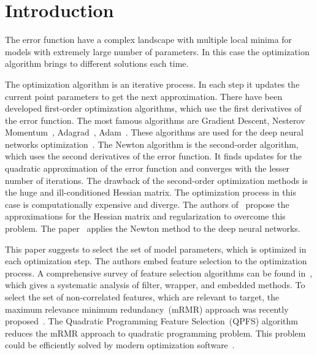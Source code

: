 \documentclass[
11pt,%
tightenlines,%
twoside,%
onecolumn,%
nofloats,%
nobibnotes,%
nofootinbib,%
superscriptaddress,%
noshowpacs,%
centertags]%
{revtex4}
\begin{document}


\maketitle


\section{Introduction}
The error function have a complex landscape with multiple local minima for models with extremely large number of parameters. 
In this case the optimization algorithm brings to different solutions each time.

The optimization algorithm is an iterative process. 
In each step it updates the current point parameters to get the next approximation.
There have been developed first-order optimization algorithms, which use the first derivatives of the error function. 
The most famous algorithms are Gradient Descent, Nesterov Momentum~\cite{nesterov1983momentum}, Adagrad~\cite{duchi2011adagrad}, Adam~\cite{kingma2014adam}. 
These algorithms are used for the deep neural networks optimization~\cite{goodfellow2016deeplearningbook}. 
The Newton algorithm is the second-order algorithm, which uses the second derivatives of the error function. 
It finds updates for the quadratic approximation of the error function and converges with the lesser number of iterations.
The drawback of the second-order optimization methods is the huge and ill-conditioned Hessian matrix. 
The optimization process in this case is computationally expensive and diverge. 
The authors of~\cite{avriel2003nonlinear,blaschke1997convergence} propose the approximations for the Hessian matrix and regularization to overcome this problem.
The paper~\cite{botev2017newtondeeplearning} applies the Newton method to the deep neural networks.

This paper suggests to select the set of model parameters, which is optimized in each optimization step.
The authors embed feature selection to the optimization process.
A comprehensive survey of feature selection algorithms can be found in~\cite{li2017feature}, which gives a systematic analysis of filter, wrapper, and embedded methods.
To select the set of non-correlated features, which are relevant to target, the maximum relevance minimum redundancy~(mRMR) approach was recently proposed~\cite{ding2005mrmr,yamada2014mrmr,peng2005feature}.
The Quadratic Programming Feature Selection~(QPFS) algorithm~\cite{katrutsa2017comprehensive,rodriguez2010qpfs} reduces the mRMR approach to quadratic programming problem. This problem could be efficiently solved by modern optimization software~\cite{bertsimas2016best}.
\end{document}
